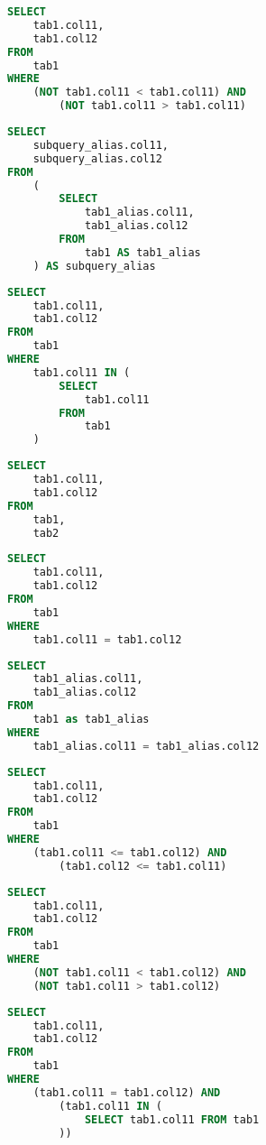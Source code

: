 \documentclass[magisterska,en]{pracamgr}
\begin{document}
\begin{lstlisting}[language=SQL, caption=Query 7]
SELECT
    tab1.col11,
    tab1.col12
FROM
    tab1
WHERE
    (NOT tab1.col11 < tab1.col11) AND
        (NOT tab1.col11 > tab1.col11)
\end{lstlisting}

\begin{lstlisting}[language=SQL, caption=Query 8]
SELECT
    subquery_alias.col11,
    subquery_alias.col12
FROM
    (
        SELECT
            tab1_alias.col11,
            tab1_alias.col12
        FROM
            tab1 AS tab1_alias
    ) AS subquery_alias
\end{lstlisting}

\begin{lstlisting}[language=SQL, caption=Query 9]
SELECT
    tab1.col11,
    tab1.col12
FROM
    tab1
WHERE
    tab1.col11 IN (
        SELECT
            tab1.col11
        FROM
            tab1
    )
\end{lstlisting}

\begin{lstlisting}[language=SQL, caption=Query 10]
SELECT
    tab1.col11,
    tab1.col12
FROM
    tab1,
    tab2
\end{lstlisting}

\begin{lstlisting}[language=SQL, caption=Query 11]
SELECT
    tab1.col11,
    tab1.col12
FROM
    tab1
WHERE
    tab1.col11 = tab1.col12
\end{lstlisting}

\begin{lstlisting}[language=SQL, caption=Query 12]
SELECT
    tab1_alias.col11,
    tab1_alias.col12
FROM
    tab1 as tab1_alias
WHERE
    tab1_alias.col11 = tab1_alias.col12
\end{lstlisting}

\begin{lstlisting}[language=SQL, caption=Query 13]
SELECT
    tab1.col11,
    tab1.col12
FROM
    tab1
WHERE
    (tab1.col11 <= tab1.col12) AND
        (tab1.col12 <= tab1.col11)
\end{lstlisting}

\begin{lstlisting}[language=SQL, caption=Query 14]
SELECT
    tab1.col11,
    tab1.col12
FROM
    tab1
WHERE
    (NOT tab1.col11 < tab1.col12) AND
    (NOT tab1.col11 > tab1.col12)
\end{lstlisting}

\begin{lstlisting}[language=SQL, caption=Query 15]
SELECT
    tab1.col11,
    tab1.col12
FROM
    tab1
WHERE
    (tab1.col11 = tab1.col12) AND
        (tab1.col11 IN (
            SELECT tab1.col11 FROM tab1
        ))
\end{lstlisting}
\end{document}
